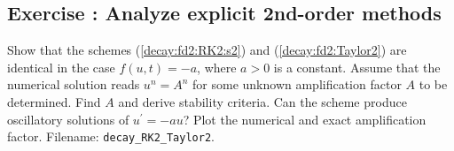 \documentclass[%
oneside,                 %
final,                   %
10pt]{article}
\newenvironment{doconceexercise}{}{}
\newcounter{doconceexercisecounter}
\begin{document}
\begin{doconceexercise}

\subsection*{Exercise \thedoconceexercisecounter: Analyze explicit 2nd-order methods}

\label{decay:exer:RK2:Taylor:analysis}

Show that the schemes (\ref{decay:fd2:RK2:s2}) and
(\ref{decay:fd2:Taylor2}) are identical in the case $f(u,t)=-a$, where
$a>0$ is a constant. Assume that the numerical solution reads
$u^n=A^n$ for some unknown amplification factor $A$ to be determined.
Find $A$ and derive stability criteria. Can the scheme produce
oscillatory solutions of $u^{\prime}=-au$? Plot the numerical and exact
amplification factor.
\noindent Filename: \Verb!decay_RK2_Taylor2!.

\end{doconceexercise}
\end{document}
